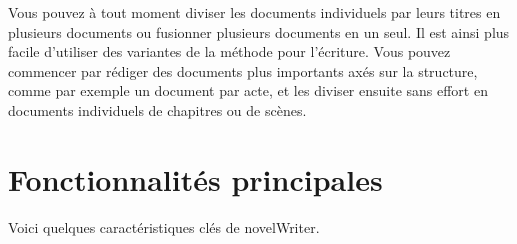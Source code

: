 \documentclass[a4paper,11pt,french]{sphinxmanual}
\begin{document}
\sphinxAtStartPar
Vous pouvez à tout moment diviser les documents individuels par leurs titres en plusieurs documents ou fusionner plusieurs documents en un seul. Il est ainsi plus facile d’utiliser des variantes de la méthode  pour l’écriture. Vous pouvez commencer par rédiger des documents plus importants axés sur la structure, comme par exemple un document par acte, et les diviser ensuite sans effort en documents individuels de chapitres ou de scènes.


\section{Fonctionnalités principales}
\label{\detokenize{int_introduction:key-features}}\label{\detokenize{int_introduction:a-intro-features}}
\sphinxAtStartPar
Voici quelques caractéristiques clés de novelWriter.
\end{document}

